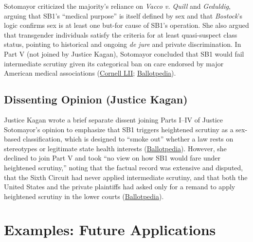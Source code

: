 \documentclass[12pt]{article}
\begin{document}
Sotomayor criticized the majority's reliance on \textit{Vacco v. Quill} and \textit{Geduldig}, arguing that SB1's ``medical purpose'' is itself defined by sex and that \textit{Bostock}'s logic confirms sex is at least one but-for cause of SB1's operation. She also argued that transgender individuals satisfy the criteria for at least quasi-suspect class status, pointing to historical and ongoing \textit{de jure} and private discrimination. In Part V (not joined by Justice Kagan), Sotomayor concluded that SB1 would fail intermediate scrutiny given its categorical ban on care endorsed by major American medical associations (\href{https://www.law.cornell.edu/supremecourt/text/23-477}{Cornell LII}; \href{https://ballotpedia.org/United_States_v._Skrmetti}{Ballotpedia}).

\subsection{Dissenting Opinion (Justice Kagan)}

Justice Kagan wrote a brief separate dissent joining Parts I--IV of Justice Sotomayor's opinion to emphasize that SB1 triggers heightened scrutiny as a sex-based classification, which is designed to ``smoke out'' whether a law rests on stereotypes or legitimate state health interests (\href{https://ballotpedia.org/United_States_v._Skrmetti}{Ballotpedia}). However, she declined to join Part V and took ``no view on how SB1 would fare under heightened scrutiny,'' noting that the factual record was extensive and disputed, that the Sixth Circuit had never applied intermediate scrutiny, and that both the United States and the private plaintiffs had asked only for a remand to apply heightened scrutiny in the lower courts (\href{https://ballotpedia.org/United_States_v._Skrmetti}{Ballotpedia}).

\section{Examples: Future Applications}
\end{document}
